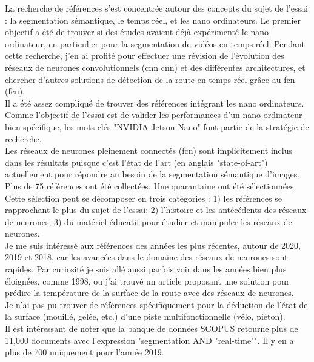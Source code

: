 ﻿\noindent La recherche de références s'est concentrée autour des concepts du sujet de l'essai : la segmentation sémantique, le temps réel, et les nano ordinateurs. Le premier objectif a été de trouver si des études avaient déjà expérimenté le nano ordinateur, en particulier pour la segmentation de vidéos en temps réel. Pendant cette recherche, j'en ai profité pour effectuer une révision de l'évolution des réseaux de neurones convolutionnels (\acrshort{cnn} \acrlong{cnn}) et des différentes architectures, et chercher d'autres solutions de détection de la route en temps réel grâce au \acrlong{fcn} (\acrshort{fcn}). 
\vspace{\baselineskip}
\\
\noindent Il a été assez compliqué de trouver des références intégrant les nano ordinateurs. Comme l'objectif de l'essai est de valider les performances d'un nano ordinateur bien spécifique, les mots-clés "NVIDIA Jetson Nano" font partie de la stratégie de recherche. 
\vspace{\baselineskip}
\\
\noindent Les réseaux de neurones pleinement connectés (\acrshort{fcn}) sont implicitement inclus dans les résultats puisque c'est l'état de l'art (en anglais "state-of-art") actuellement pour répondre au besoin de la segmentation sémantique d'images.
\vspace{\baselineskip}
\\
\noindent Plus de 75 références ont été collectées. Une quarantaine ont été sélectionnées. Cette sélection peut se décomposer en trois catégories : 1) les références se rapprochant le plus du sujet de l'essai; 2) l'histoire et les antécédents des réseaux de neurones; 3) du matériel éducatif pour étudier et manipuler les réseaux de neurones.
\vspace{\baselineskip}
\\
\noindent Je me suis intéressé aux références des années les plus récentes, autour de 2020, 2019 et 2018, car les avancées dans le domaine des réseaux de neurones sont rapides. Par curiosité je suis allé aussi parfois voir dans les années bien plus éloignées, comme 1998, ou j'ai trouvé un article proposant une solution pour prédire la température de la surface de la route avec des réseaux de neurones.
\vspace{\baselineskip}
\\
\noindent Je n'ai pas pu trouver de références spécifiquement pour la déduction de l'état de la surface (mouillé, gelée, etc.) d'une piste multifonctionnelle (vélo, piéton). 
\vspace{\baselineskip}
\\
\noindent Il est intéressant de noter que la banque de données SCOPUS retourne plus de 11,000 documents avec l'expression "segmentation AND "real-time"". Il y en a plus de 700 uniquement pour l'année 2019. 